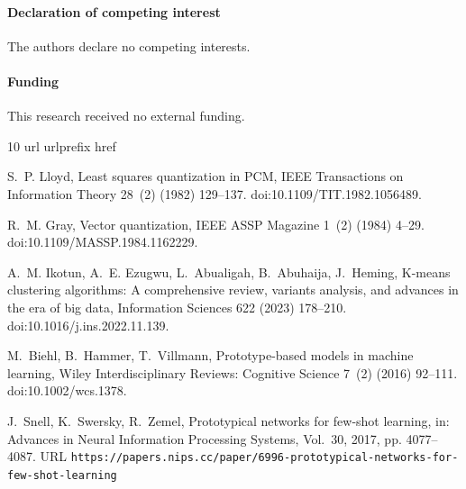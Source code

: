 \documentclass[5p,times,twocolumn]{elsarticle}
\begin{document}
\paragraph{Declaration of competing interest}
The authors declare no competing interests.

\paragraph{Funding}
This research received no external funding.
\setlength{\bibsep}{0 pt}
\def\UrlBreaks{\do\/\do-\do\_\do\.\do\?\do\&\do\=\do\0\do\1\do\2\do\3\do\4\do\5\do\6\do\7\do\8\do\9}

\begin{thebibliography}{10}
\expandafter\ifx\csname url\endcsname\relax
  \def\url#1{\texttt{#1}}\fi
\expandafter\ifx\csname urlprefix\endcsname\relax\def\urlprefix{URL }\fi
\expandafter\ifx\csname href\endcsname\relax
  \def\href#1#2{#2} \def\path#1{#1}\fi


S.~P. Lloyd, Least squares quantization in {PCM}, IEEE Transactions on
  Information Theory 28~(2) (1982) 129--137.
\newblock \href {https://doi.org/10.1109/TIT.1982.1056489}
  {\path{doi:10.1109/TIT.1982.1056489}}.

R.~M. Gray, Vector quantization, IEEE ASSP Magazine 1~(2) (1984) 4--29.
\newblock \href {https://doi.org/10.1109/MASSP.1984.1162229}
  {\path{doi:10.1109/MASSP.1984.1162229}}.

A.~M. Ikotun, A.~E. Ezugwu, L.~Abualigah, B.~Abuhaija, J.~Heming, K-means
  clustering algorithms: A comprehensive review, variants analysis, and
  advances in the era of big data, Information Sciences 622 (2023) 178--210.
\newblock \href {https://doi.org/10.1016/j.ins.2022.11.139}
  {\path{doi:10.1016/j.ins.2022.11.139}}.

M.~Biehl, B.~Hammer, T.~Villmann, Prototype-based models in machine learning,
  Wiley Interdisciplinary Reviews: Cognitive Science 7~(2) (2016) 92--111.
\newblock \href {https://doi.org/10.1002/wcs.1378}
  {\path{doi:10.1002/wcs.1378}}.

J.~Snell, K.~Swersky, R.~Zemel,
  \href{https://papers.nips.cc/paper/6996-prototypical-networks-for-few-shot-learning}{Prototypical
  networks for few-shot learning}, in: Advances in Neural Information
  Processing Systems, Vol.~30, 2017, pp. 4077--4087.
\newline\urlprefix\url{https://papers.nips.cc/paper/6996-prototypical-networks-for-few-shot-learning}


\end{thebibliography}
\end{document}
